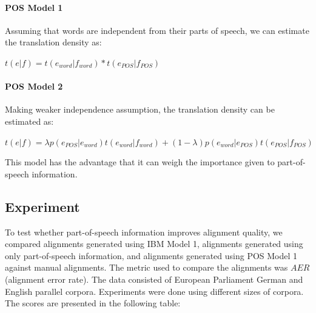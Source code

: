 \documentclass[11pt]{report}
\theoremstyle{plain}
\begin{document}
{\paragraph{POS Model 1}

Assuming that words are independent from their parts of speech, we
can estimate the translation density as:

\begin{center}
$t(e|f) = t(e_{word}|f_{word}) * t(e_{POS}|f_{POS})$
\end{center}



\paragraph{POS Model 2}

Making weaker independence assumption, the translation density can
be estimated as:

\begin{center}

$t(e|f) = \lambda p(e_{POS}|e_{word})t(e_{word}|f_{word}) +
(1-\lambda) p(e_{word}|e_{POS}) t(e_{POS}|f_{POS})$
\end{center}

This model has the advantage that it can weigh the importance given
to part-of-speech information.

\subsection{Experiment}
To test whether part-of-speech information improves alignment
quality, we compared alignments generated using IBM Model 1,
alignments generated using only part-of-speech information, and
alignments generated using POS Model 1 against manual alignments.
The metric used to compare the alignments was $AER$ (alignment error
rate). The data consisted of European Parliament German and English
parallel corpora. Experiments were done using different sizes of
corpora. The scores are presented in the following table:

}
\end{document}
